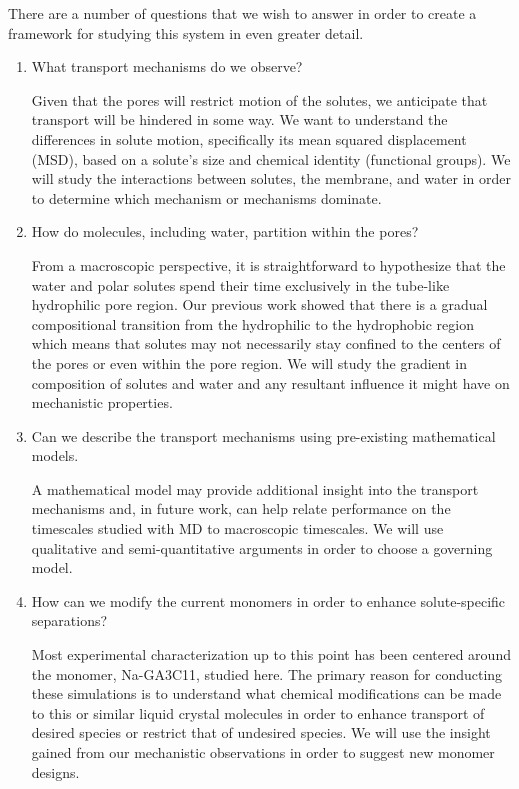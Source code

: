 \documentclass{article}
\begin{document}
  There are a number of questions that we wish to answer in order to create a
  framework for studying this system in even greater detail.
  \begin{enumerate}
  
   	\item What transport mechanisms do we observe?
  	
  	Given that the pores will restrict motion of the solutes, we anticipate that 
  	transport will be hindered in some way. We want to understand the differences in
  	solute motion, specifically its mean squared displacement (MSD), based on a solute's
  	size and chemical identity (functional groups). We will study the interactions
  	between solutes, the membrane, and water in order to determine which mechanism
  	or mechanisms dominate.
  	
  
  	\item How do molecules, including water, partition within the pores?
  	
  	From a macroscopic perspective, it is straightforward to hypothesize that the water and
  	polar solutes spend their time exclusively in the tube-like hydrophilic pore region.
  	Our previous work showed that there is a gradual compositional transition from the 
  	hydrophilic to the hydrophobic region which means that solutes may not 
  	necessarily stay confined to the centers of the pores or even within the
  	pore region. We will study the gradient in composition of solutes and water
  	and any resultant influence it might have on mechanistic properties.
  	
  	\item Can we describe the transport mechanisms using pre-existing 
  	mathematical models.
  	
  	A mathematical model may provide additional insight into the transport
  	mechanisms and, in future work, can help relate performance on the 
  	timescales studied with MD to macroscopic timescales. We will use
  	qualitative and semi-quantitative arguments in order to choose a 
  	governing model. 
  	
  	\item How can we modify the current monomers in order to enhance
  	solute-specific separations? 
  	
  	Most experimental characterization up to this point has been centered 
  	around the monomer, Na-GA3C11, studied here. The primary reason for conducting
  	these simulations is to understand what chemical modifications can be made 
  	to this or similar liquid crystal molecules in order to enhance transport 
  	of desired species or restrict that of undesired species. We will use the 
  	insight gained from our mechanistic observations in order to suggest new 
  	monomer designs.
  	
  \end{enumerate} 
  
\end{document}
